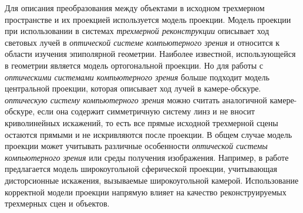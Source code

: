 \begin{SCn}
\end{SCn}

Для описания преобразования между объектами в исходном трехмерном пространстве и их проекцией используется модель проекции. Модель проекции при использовании в системах \textit{трехмерной реконструкции} описывает ход световых лучей в \textit{оптической системе компьютерного зрения} и относится к области изучения эпиполярной геометрии. Наиболее известной, использующейся в геометрии является модель ортогональной проекции. Но для работы с \textit{оптическими системами компьютерного зрения} больше подходит модель центральной проекции, которая описывает ход лучей в камере-обскуре. \textit{оптическую систему компьютерного зрения} можно считать аналогичной камере-обскуре, если она содержит симметричную систему линз и не вносит криволинейных искажений, то есть все прямые исходной трехмерной сцены остаются прямыми и не искривляются после проекции. В общем случае модель проекции может учитывать различные особенности \textit{оптической системы компьютерного зрения} или среды получения изображения. Например, в работе  предлагается модель широкоугольной сферической проекции, учитывающая дисторсионные искажения, вызываемые широкоугольной камерой. Использование корректной модели проекции напрямую влияет на качество реконструируемых трехмерных сцен и объектов.

\begin{SCn}
\end{SCn}

